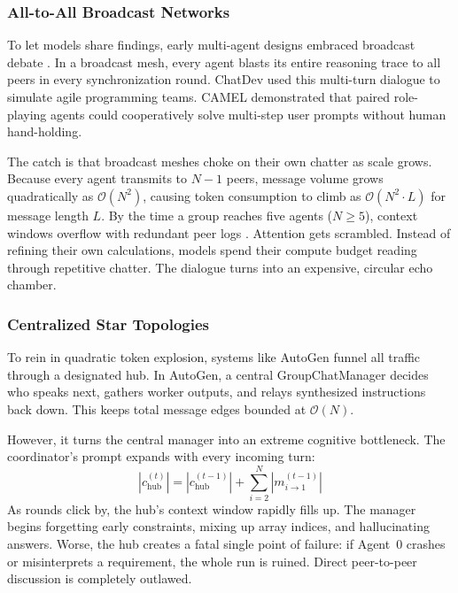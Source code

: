 \documentclass{ieeeaccess}
\begin{document}
\subsubsection{All-to-All Broadcast Networks}
To let models share findings, early multi-agent designs embraced broadcast debate \cite{du2023debate, li2023camel}. In a broadcast mesh, every agent blasts its entire reasoning trace to all peers in every synchronization round. ChatDev \cite{qian2024chatdev} used this multi-turn dialogue to simulate agile programming teams. CAMEL \cite{li2023camel} demonstrated that paired role-playing agents could cooperatively solve multi-step user prompts without human hand-holding.

The catch is that broadcast meshes choke on their own chatter as scale grows. Because every agent transmits to $N-1$ peers, message volume grows quadratically as $\mathcal{O}(N^2)$, causing token consumption to climb as $\mathcal{O}(N^2 \cdot L)$ for message length $L$. By the time a group reaches five agents ($N \ge 5$), context windows overflow with redundant peer logs \cite{wang2025scaling}. Attention gets scrambled. Instead of refining their own calculations, models spend their compute budget reading through repetitive chatter. The dialogue turns into an expensive, circular echo chamber.

\subsubsection{Centralized Star Topologies}
To rein in quadratic token explosion, systems like AutoGen \cite{wu2024autogen} funnel all traffic through a designated hub. In AutoGen, a central GroupChatManager decides who speaks next, gathers worker outputs, and relays synthesized instructions back down. This keeps total message edges bounded at $\mathcal{O}(N)$.

However, it turns the central manager into an extreme cognitive bottleneck. The coordinator's prompt expands with every incoming turn:
\begin{equation}
\label{eq:hub_inflation}
|c_{\text{hub}}^{(t)}| = |c_{\text{hub}}^{(t-1)}| + \sum_{i=2}^N |m_{i \to 1}^{(t-1)}|
\end{equation}
As rounds click by, the hub's context window rapidly fills up. The manager begins forgetting early constraints, mixing up array indices, and hallucinating answers. Worse, the hub creates a fatal single point of failure: if Agent~0 crashes or misinterprets a requirement, the whole run is ruined. Direct peer-to-peer discussion is completely outlawed.
\end{document}
